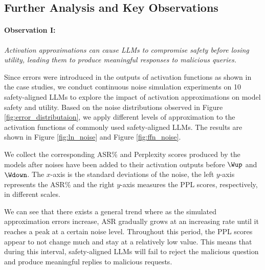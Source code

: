 \subsection{Further Analysis and Key Observations} \label{sec:observations}
\paragraph{Observation I:} \textit{Activation approximations can cause LLMs to compromise safety before losing utility, leading them to produce meaningful responses to malicious queries.}

Since errors were introduced in the outputs of activation functions as shown in the case studies, we conduct continuous noise simulation experiments on 10 safety-aligned LLMs to explore the impact of activation approximations on model safety and utility. Based on the noise distributions observed in Figure \ref{fig:error_distributaion}, we apply different levels of approximation to the activation functions of commonly used safety-aligned LLMs. The results are shown in Figure \ref{fig:ln_noise} and Figure \ref{fig:ffn_noise}.

We collect the corresponding ASR\% and Perplexity scores produced by the models after noises have been added to their activation outputs before $\Wup$ and $\Wdown$. The $x$-axis is the standard deviations of the noise, the left $y$-axis represents the ASR\% and the right $y$-axis measures the PPL scores, respectively, in different scales.

We can see that there exists a general trend where as the simulated approximation errors increase, ASR gradually grows at an increasing rate until it reaches a peak at a certain noise level. Throughout this period, the PPL scores appear to not change much and stay at a relatively low value. This means that during this interval, safety-aligned LLMs will fail to reject the malicious question and produce meaningful replies to malicious requests.



